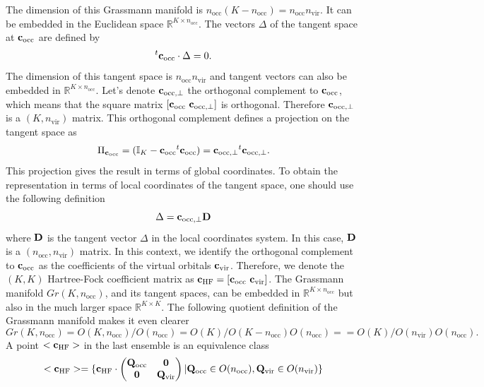 \documentclass[11pt,a4paper]{article}
\newcommand{\HF}{\text{HF}}
\newcommand{\occ}{\text{occ}}
\newcommand{\vir}{\text{vir}}
\begin{document}
The dimension of this Grassmann manifold is $n_\occ(K-n_\occ)=n_\occ n_\vir$. It can be embedded in the Euclidean space $\mathbb{R}^{K\times n_\occ}$.
The vectors $\Delta$ of the tangent space at $\vb{c}_\occ$ are defined by
\begin{equation}
  \label{eq:HF_TangentSpace}
  {}^t\vb{c}_\occ \cdot \Delta = 0.
\end{equation}
The dimension of this tangent space is $n_\occ n_\vir$ and tangent vectors can also be embedded in $\mathbb{R}^{K\times n_\occ}$.
Let's denote $\vb{c}_{\occ,\perp}$ the orthogonal complement to $\vb{c}_{\occ}$, which means that the square matrix $[\vb{c}_{\occ}~\vb{c}_{\occ,\perp}]$ is orthogonal.
Therefore $\vb{c}_{\occ,\perp}$ is a $(K,n_\vir)$ matrix.
This orthogonal complement defines a projection on the tangent space as
\begin{equation}
  \label{eq:HF_ProjectionTangent}
  \Pi_{\vb{c}_\occ}= (\mathbb{I}_K - \vb{c}_{\occ}{}^t\vb{c}_{\occ}) = \vb{c}_{\occ,\perp}{}^t\vb{c}_{\occ,\perp}.
\end{equation}
This projection gives the result in terms of global coordinates. To obtain the representation in terms of local coordinates of the tangent space, one should use the following definition
\begin{equation}
  \label{eq:HF_GlobalLocalTangent}
  \Delta = \vb{c}_{\occ,\perp} \vb{D}
\end{equation}
where $\vb{D}$ is the tangent vector $\Delta$ in the local coordinates system. In this case, $\vb{D}$ is a $(n_\occ,n_\vir)$ matrix.
In this context, we identify the orthogonal complement to $\vb{c}_\occ$ as the coefficients of the virtual orbitals $\vb{c}_\vir$. Therefore, we denote the $(K,K)$ Hartree-Fock coefficient matrix as $\vb{c}_\HF = [\vb{c_\occ}~\vb{c_\vir}]$.
The Grassmann manifold $Gr(K,n_\occ)$, and its tangent spaces,  can be embedded in $\mathbb{R}^{K\times n_\occ}$ but also in the much larger space $\mathbb{R}^{K\times K}$.
The following quotient definition of the Grassmann manifold makes it even clearer
\begin{equation}
  \label{eq:HF_GrassmannQuotient}
  Gr(K,n_\occ) = O(K,n_\occ)/O(n_\occ)=O(K)/O(K-n_\occ)O(n_\occ)==O(K)/O(n_\vir)O(n_\occ).
\end{equation}
A point $<\vb{c_\HF}>$ in the last ensemble is an equivalence class
\begin{equation}
  \label{eq:HF_PointGrassmannQuotient}
  <\vb{c_\HF}> = \{ \vb{c_\HF} \cdot \begin{pmatrix}\vb{Q}_\occ & \vb{0} \\ \vb{0} & \vb{Q}_\vir\end{pmatrix}  | \vb{Q}_\occ \in O(n_\occ), \vb{Q}_\vir \in O(n_\vir)\}
\end{equation}
\end{document}
